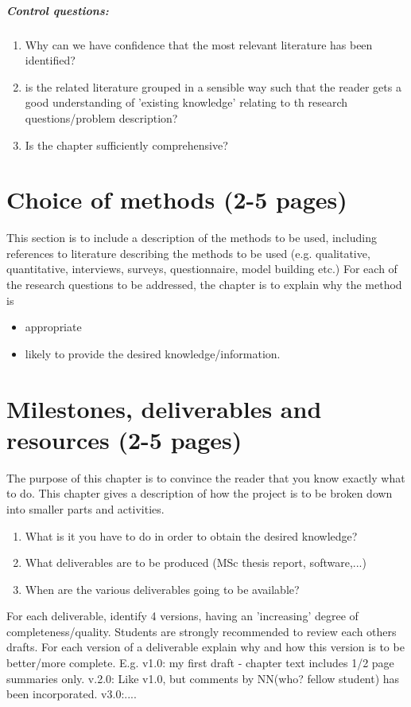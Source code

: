 \documentclass[gjovik]{gucmasterproject}
\begin{document}
\paragraph{Control questions:}
\begin{enumerate}
\item Why can we have confidence that the most relevant literature has been identified?
\item is the related literature grouped in a sensible way such that the reader gets a good understanding of 'existing knowledge' relating to th research questions/problem description?
\item Is the chapter sufficiently comprehensive?
\end{enumerate}

\chapter{Choice of methods (2-5 pages)}
This section is to include a description of the methods to be used,
including references to literature describing the methods to be used
(e.g. qualitative, quantitative, interviews, surveys,
questionnaire,  model building etc.)
For each of the research questions to be addressed,
the chapter is to explain why the method is
\begin{itemize}
\item appropriate
\item likely to provide the desired knowledge/information.
\end{itemize}

\chapter{Milestones, deliverables and resources (2-5 pages)}
The purpose of this chapter is to convince the reader that you know exactly what to do.
This chapter gives a description of how the project is to be
broken down into smaller parts and activities.
\begin{enumerate}
\item  What is it you have to do in order to obtain the desired knowledge?
\item  What deliverables are to be produced (MSc thesis report, software,...)
\item  When are the various deliverables going to be available?
\end{enumerate}

For each deliverable, identify 4 versions, having an
'increasing' degree of completeness/quality.
Students are strongly recommended to review each others drafts.
For each version of a deliverable explain why and how this version is to
be better/more complete.  E.g. v1.0: my first draft -
chapter text includes 1/2 page summaries only.
v.2.0: Like v1.0, but comments by NN(who? fellow student)
has been incorporated. v3.0:....
\end{document}
